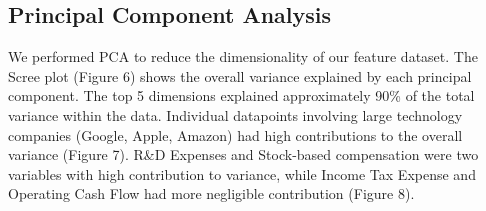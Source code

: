 \documentclass[11pt,]{article}
\begin{document}
\hypertarget{principal-component-analysis-1}{%
\subsection{Principal Component
Analysis}\label{principal-component-analysis-1}}

We performed PCA to reduce the dimensionality of our feature dataset.
The Scree plot (Figure 6) shows the overall variance explained by each
principal component. The top 5 dimensions explained approximately 90\%
of the total variance within the data. Individual datapoints involving
large technology companies (Google, Apple, Amazon) had high
contributions to the overall variance (Figure 7). R\&D Expenses and
Stock-based compensation were two variables with high contribution to
variance, while Income Tax Expense and Operating Cash Flow had more
negligible contribution (Figure 8).
\end{document}
